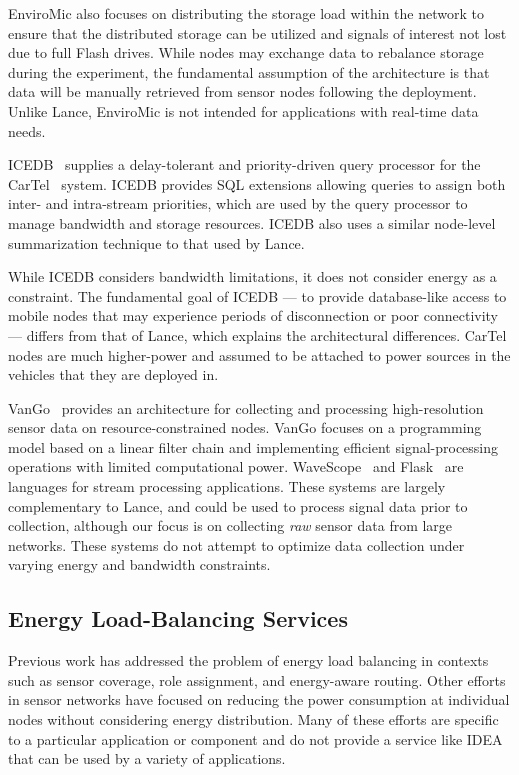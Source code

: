 EnviroMic also focuses on distributing the storage load within the network to
ensure that the distributed storage can be utilized and signals of interest
not lost due to full Flash drives. While nodes may exchange data to rebalance
storage during the experiment, the fundamental assumption of the architecture
is that data will be manually retrieved from sensor nodes following the
deployment. Unlike Lance, EnviroMic is not intended for applications with
real-time data needs.

ICEDB~\cite{zhang2007icedb} supplies a delay-tolerant and priority-driven
query processor for the CarTel~\cite{cartel} system. ICEDB provides SQL
extensions allowing queries to assign both inter- and intra-stream
priorities, which are used by the query processor to manage bandwidth and
storage resources. ICEDB also uses a similar node-level summarization
technique to that used by Lance.

While ICEDB considers bandwidth limitations, it does not consider energy as a
constraint. The fundamental goal of ICEDB --- to provide database-like access
to mobile nodes that may experience periods of disconnection or poor
connectivity --- differs from that of Lance, which explains the architectural
differences. CarTel nodes are much higher-power and assumed to be attached to
power sources in the vehicles that they are deployed in.

VanGo~\cite{vango} provides an architecture for collecting and processing
high-resolution sensor data on resource-constrained nodes. VanGo focuses on a
programming model based on a linear filter chain and implementing efficient
signal-processing operations with limited computational power.
WaveScope~\cite{wavescope} and Flask~\cite{flask-tr} are languages for stream
processing applications. These systems are largely complementary to Lance,
and could be used to process signal data prior to collection, although our
focus is on collecting \textit{raw} sensor data from large networks. These
systems do not attempt to optimize data collection under varying energy and
bandwidth constraints. 

\subsection{Energy Load-Balancing Services}
\label{idea-sec-related}

Previous work has addressed the problem of energy load balancing in contexts
such as sensor coverage, role assignment, and energy-aware routing. Other
efforts in sensor networks have focused on reducing the power consumption at
individual nodes without considering energy distribution. Many of these
efforts are specific to a particular application or component and do not
provide a service like IDEA that can be used by a variety of applications. 


